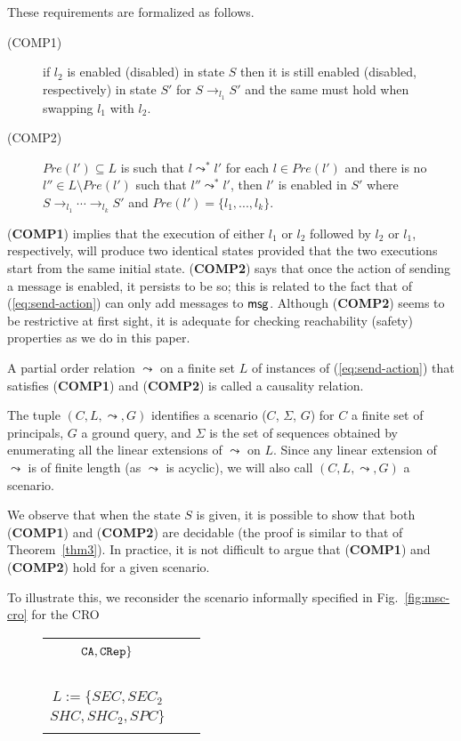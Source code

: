 \documentclass[conference]{llncs}
\newcommand{\theCA}{\ensuremath \mathtt{CA}}
\newcommand{\Ed}{\ensuremath \mathtt{Ed}}
\newcommand{\Helen}{\ensuremath \mathtt{Helen}}
\newcommand{\CRep}{\ensuremath \mathtt{CRep}}
\newcommand{\msg}{\ensuremath \mathsf{msg}}
\newcommand{\CRO}{CRO}
\begin{document}
{These requirements are
formalized as follows.
\begin{description}
\item[(COMP1)] if $l_2$ is enabled (disabled) in state $S$ then it is
  still enabled (disabled, respectively) in state $S'$ for
  $S\rightarrow_{l_1} S'$ and the same must hold when swapping $l_1$
  with $l_2$.
\item[(COMP2)] $Pre(l')\subseteq L$ is such that $l\leadsto^* l'$ for
  each $l\in Pre(l')$ 
and there is no $l''\in L\setminus Pre(l')$ such that
  $l''\leadsto^* l'$, then $l'$ is enabled in $S'$ where
  $S\rightarrow_{l_1} \cdots \rightarrow_{l_k} S'$ and $Pre(l')=\{l_1,
  ..., l_k\}$.
\end{description}
(\textbf{COMP1}) implies that the execution of either $l_1$ or $l_2$
followed by $l_2$ or $l_1$, respectively, will produce two identical
states provided that the two executions start from the same initial
state.  
(\textbf{COMP2}) says that once the action of sending a
message is enabled, it persists to be so; this is related to the fact
that of (\ref{eq:send-action}) can only add messages to $\msg$.
Although (\textbf{COMP2}) seems to be restrictive at first sight, it
is adequate for checking reachability (safety) properties as we do in
this paper.


\begin{definition}
A partial order relation $\leadsto$ on a finite set $L$ of instances
of (\ref{eq:send-action}) that satisfies (\textbf{COMP1}) and
(\textbf{COMP2}) is called a causality relation.  
\end{definition}

The tuple
$(C, L, \leadsto, G)$ identifies a scenario ($C$, $\Sigma$, $G$) for
$C$ a finite set of principals, $G$ a ground query, and $\Sigma$ is
the set of sequences obtained by enumerating all the linear extensions
of $\leadsto$ on $L$.  
Since any linear extension of $\leadsto$ is of finite length (as
$\leadsto$ is acyclic), we will also call $(C, L, \leadsto, G)$ a
scenario.

We observe that when the state $S$ is given, it is possible to show
that both (\textbf{COMP1}) and (\textbf{COMP2}) are decidable (the
proof is similar to that of Theorem~\ref{thm3}).  In practice, it is
not difficult to argue that (\textbf{COMP1}) and (\textbf{COMP2}) hold
for a given scenario.  

\begin{example}
To illustrate this, we reconsider the scenario
informally specified in Fig.~\ref{fig:msc-cro} for the \CRO
\begin{figure}[t] 
\begin{tabular}{ccc}
    \begin{minipage}{2.9cm}
$C := \{\Ed,\Helen,$ \\
\quad\quad $\theCA, \CRep\}$\\
\ \\
$L := \{\mathit{SEC},\mathit{SEC}_2$\\
$\mathit{SHC}, \mathit{SHC}_2,
        \mathit{SPC}
      \}$
\\


\end{minipage}
\end{tabular}
\end{figure}
\end{example}}
\end{document}
